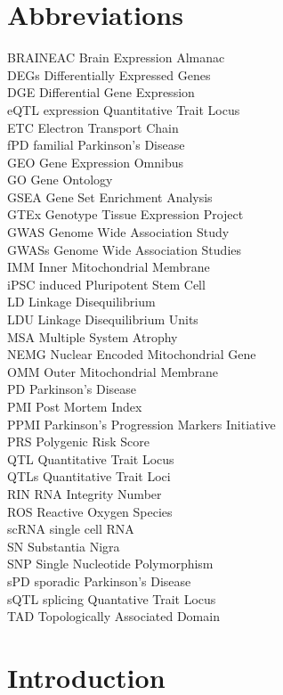 \documentclass{article}
\begin{document}
\section{Abbreviations}
BRAINEAC Brain Expression Almanac
\\DEGs Differentially Expressed Genes
\\DGE Differential Gene Expression
\\eQTL expression Quantitative Trait Locus
\\ETC Electron Transport Chain
\\fPD familial Parkinson's Disease
\\GEO Gene Expression Omnibus
\\GO Gene Ontology
\\GSEA Gene Set Enrichment Analysis
\\GTEx Genotype Tissue Expression Project
\\GWAS Genome Wide Association Study
\\GWASs Genome Wide Association Studies
\\IMM Inner Mitochondrial Membrane
\\iPSC induced Pluripotent Stem Cell
\\LD Linkage Disequilibrium
\\LDU Linkage Disequilibrium Units
\\MSA Multiple System Atrophy
\\NEMG Nuclear Encoded Mitochondrial Gene
\\OMM Outer Mitochondrial Membrane
\\PD Parkinson's Disease
\\PMI Post Mortem Index
\\PPMI Parkinson's Progression Markers Initiative
\\PRS Polygenic Risk Score
\\QTL Quantitative Trait Locus
\\QTLs Quantitative Trait Loci
\\RIN RNA Integrity Number
\\ROS Reactive Oxygen Species
\\scRNA single cell RNA
\\SN Substantia Nigra
\\SNP Single Nucleotide Polymorphism
\\sPD sporadic Parkinson's Disease
\\sQTL splicing Quantative Trait Locus
\\TAD Topologically Associated Domain
\newpage
\section{Introduction}
\end{document}
